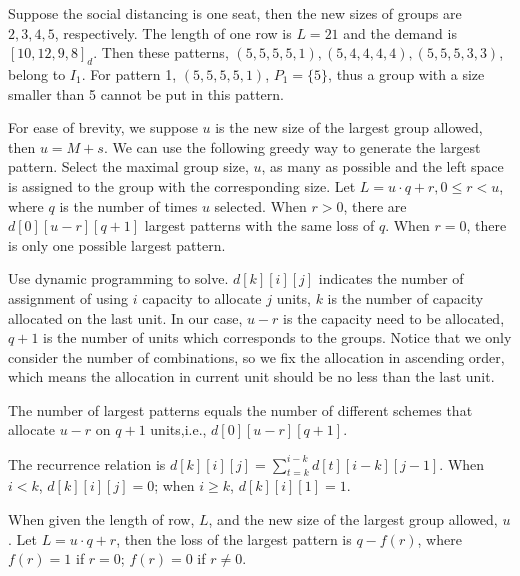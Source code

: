 \begin{example}
  Suppose the social distancing is one seat, then the new sizes of groups are $2, 3, 4, 5$, respectively. The length of one row is $L = 21$ and the demand is $[10, 12, 9, 8]_d$. Then these patterns, $(5, 5, 5, 5, 1), (5, 4, 4, 4, 4),(5, 5, 5, 3, 3)$, belong to $I_1$. For pattern 1, $(5, 5, 5, 5, 1)$, $P_{1} = \{5\}$, thus a group with a size smaller than 5 cannot be put in this pattern.
\end{example}


For ease of brevity, we suppose $u$ is the new size of the largest group allowed, then $u = M+s$.
We can use the following greedy way to generate the largest pattern. Select the maximal group size, $u$, as many as possible and the left space is assigned to the group with the corresponding size. Let $L = u\cdot q + r, 0 \leq r < u$, where $q$ is the number of times $u$ selected. When $r>0$, there are $d[0][u-r][q+1]$ largest patterns with the same loss of $q$. When $r =0$, there is only one possible largest pattern.


Use dynamic programming to solve. $d[k][i][j]$ indicates the number of assignment of using $i$ capacity to allocate $j$ units, $k$ is the number of capacity allocated on the last unit. In our case, $u-r$ is the capacity need to be allocated, $q+1$ is the number of units which corresponds to the groups. Notice that we only consider the number of combinations, so we fix the allocation in ascending order, which means the allocation in current unit should be no less than the last unit.  

The number of largest patterns equals the number of different schemes that allocate $u-r$ on $q+1$ units,i.e., $d[0][u-r][q+1]$.

The recurrence relation is $d[k][i][j] = \sum_{t=k}^{i-k} d[t][i-k][j-1]$. 
When $i < k$, $d[k][i][j] =0$; when $i \geq k$, $d[k][i][1] =1$.

\begin{lem}
When given the length of row, $L$, and the new size of the largest group allowed, $u$. Let $L = u\cdot q + r$, then the loss of the largest pattern is $q - f(r)$, where $f(r) =1$ if $r=0$; $f(r) =0$ if $r \neq 0$.
\end{lem}

